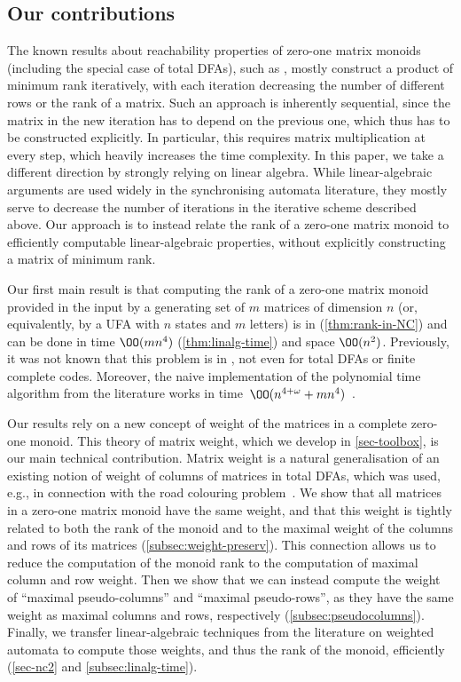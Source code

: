 \subsection{Our contributions}
The known results about reachability properties of zero-one matrix monoids (including the special case of total DFAs), such as \cite{Carpi1988,Eppstein1990,Ryzhikov2019WORDS,Kiefer2021}, mostly construct a product of minimum rank iteratively, with each iteration decreasing the number of different rows or the rank of a matrix.
Such an approach is inherently sequential, since the matrix in the new iteration has to depend on the previous one, which thus has to be constructed explicitly.
In particular, this requires matrix multiplication at every step, which heavily increases the time complexity. In this paper, we take a different direction by strongly relying on linear algebra. While linear-algebraic arguments are used widely in the synchronising automata literature, they mostly serve to decrease the number of iterations in the iterative scheme described above. Our approach is to instead relate the rank of a zero-one matrix monoid to efficiently computable linear-algebraic properties, without explicitly constructing a matrix of minimum rank.

Our first main result is that computing the rank of a zero-one matrix monoid provided in the input by a generating set of $m$ matrices of dimension $n$ (or, equivalently, by a UFA with $n$ states and $m$ letters) is in \NCT (\autoref{thm:rank-in-NC}) and can be done in time $\OO(mn^4)$ (\autoref{thm:linalg-time}) and space $\OO(n^2)$. Previously, it was not known that this problem is in \NC, not even for total DFAs or finite complete codes. Moreover, the naive implementation of the polynomial time algorithm from the literature works in time~$\OO(n^{4 + \omega} + mn^4)$~\cite{Carpi1988}.

Our results rely on a new concept of weight of the matrices in a complete zero-one monoid.
This theory of matrix weight, which we develop in \cref{sec-toolbox}, is our main technical contribution.
Matrix weight is a natural generalisation of an existing notion of weight of columns of matrices in total DFAs, which was used, e.g., in connection with the road colouring problem~\cite{Friedman1990,Kari2001,Gusev2016}.
We show that all matrices in a zero-one matrix monoid have the same weight, and that this weight is tightly related to both the rank of the monoid and to the maximal weight of the columns and rows of its matrices (\autoref{subsec:weight-preserv}).
This connection allows us to reduce the computation of the monoid rank to the computation of maximal column and row weight.
Then we show that we can instead compute the weight of ``maximal pseudo-columns'' and ``maximal pseudo-rows'', as they have the same weight as maximal columns and rows, respectively (\autoref{subsec:pseudocolumns}).
Finally, we transfer linear-algebraic techniques from the literature on weighted automata to compute those weights, and thus the rank of the monoid, efficiently (\autoref{sec-nc2} and \autoref{subsec:linalg-time}).

